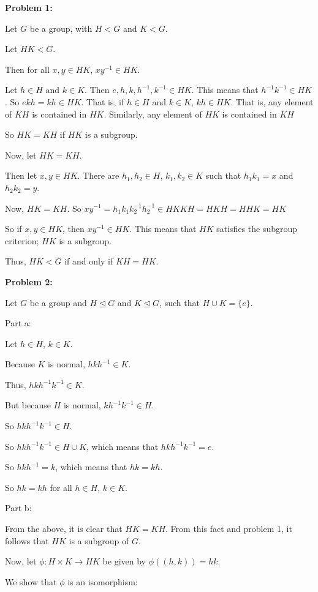 \documentclass[a4paper,12pt]{article}
\newcommand{\tab}{\hspace{4mm}} %
\newcommand{\shunt}{\vspace{20mm}}
\newcommand{\subgp}{\mathrel{\unlhd}}
\begin{document}
{\bf Problem 1:}

Let $G$ be a group, with $H<G$ and $K <G$.

Let $HK < G$.

\tab Then for all $x,y \in HK$, $xy^{-1} \in HK$.

\tab Let $h \in H$ and $k \in K$. Then $e,h,k,h^{-1},k^{-1} \in HK$. This means that $h^{-1}k^{-1} \in HK$. So $ekh = kh \in HK$. That is, if $h \in H$ and $k \in K$, $kh \in HK$. That is, any element of $KH$ is contained in $HK$. Similarly, any element of $HK$ is contained in $KH$

\tab So $HK = KH$ if $HK$ is a subgroup.

Now, let $HK=KH$.

\tab Then let $x,y \in HK$. There are $h_1,h_2 \in H$, $k_1,k_2 \in K$ such that $h_1k_1 = x$ and $h_2k_2 = y$.

\tab Now, $HK=KH$. So $xy^{-1} = h_1k_1k_2^{-1}h_2^{-1} \in HKKH=HKH=HHK=HK$

\tab So if $x,y \in HK$, then $xy^{-1} \in HK$. This means that $HK$ satisfies the subgroup criterion; $HK$ is a subgroup.

Thus, $HK < G$ if and only if $KH=HK$.

\shunt

{\bf Problem 2:}

Let $G$ be a group and $H \subgp G$ and $K \subgp G$, such that $H \cup K = \{e\}$.

Part a:

Let $h \in H$, $k \in K$.

Because $K$ is normal, $hkh^{-1} \in K$.

Thus, $hkh^{-1}k^{-1} \in K$.

But because $H$ is normal, $kh^{-1}k^{-1} \in H$.

So $hkh^{-1}k^{-1} \in H$.

So $hkh^{-1}k^{-1} \in H \cup K$, which means that $hkh^{-1}k^{-1} = e$.

So $hkh^{-1} = k$, which means that $hk = kh$.

So $hk = kh$ for all $h \in H$, $k \in K$.

\shunt

Part b:

From the above, it is clear that $HK = KH$. From this fact and problem 1, it follows that $HK$ is a subgroup of $G$.

Now, let $\phi : H \times K \to HK$ be given by $\phi((h,k)) = hk$.

We show that $\phi$ is an isomorphism:
\end{document}
